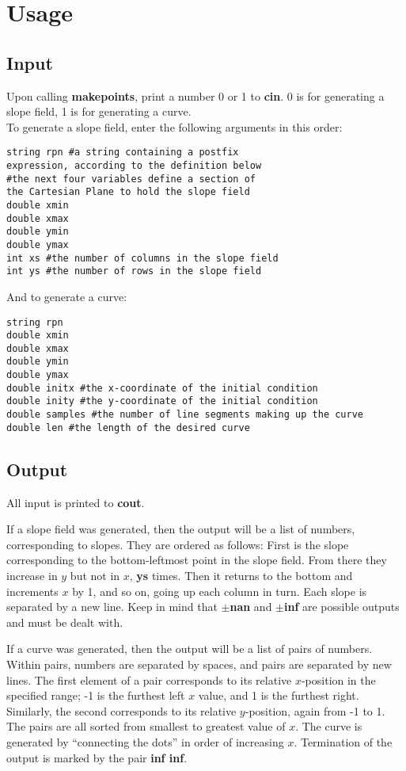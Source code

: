 \documentclass{article}
\begin{document}
\section{Usage}
\subsection{Input}

Upon calling \textbf{makepoints}, print a number 0 or 1 to \textbf{cin}. 0 is for generating a slope field, 1 is for generating a curve.\\
To generate a slope field, enter the following arguments in this order:

\begin{verbatim}
string rpn #a string containing a postfix
expression, according to the definition below
#the next four variables define a section of
the Cartesian Plane to hold the slope field
double xmin
double xmax
double ymin
double ymax
int xs #the number of columns in the slope field
int ys #the number of rows in the slope field
\end{verbatim}

And to generate a curve:
\begin{verbatim}
string rpn
double xmin
double xmax
double ymin
double ymax
double initx #the x-coordinate of the initial condition
double inity #the y-coordinate of the initial condition
double samples #the number of line segments making up the curve
double len #the length of the desired curve
\end{verbatim}
\subsection{Output}
All input is printed to \textbf{cout}.

If a slope field was generated, then the output will be a list of numbers, corresponding to slopes. They are ordered as follows: First is the slope corresponding to the bottom-leftmost point in the slope field. From there they increase in $y$ but not in $x$, \textbf{ys} times. Then it returns to the bottom and increments $x$ by 1, and so on, going up each column in turn. Each slope is separated by a new line. Keep in mind that $\pm$\textbf{nan} and $\pm$\textbf{inf} are possible outputs and must be dealt with.

If a curve was generated, then the output will be a list of pairs of numbers. Within pairs, numbers are separated by spaces, and pairs are separated by new lines. The first element of a pair corresponds to its relative $x$-position in the specified range; -1 is the furthest left $x$ value, and 1 is the furthest right. Similarly, the second corresponds to its relative $y$-position, again from -1 to 1. The pairs are all sorted from smallest to greatest value of $x$. The curve is generated by ``connecting the dots'' in order of increasing $x$. Termination of the output is marked by the pair \textbf{inf inf}.
\end{document}
